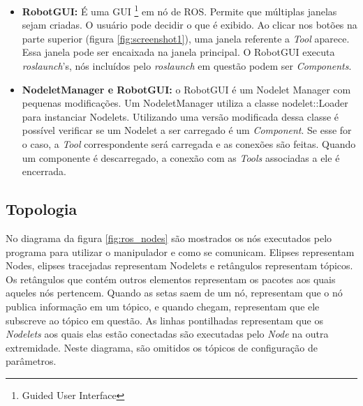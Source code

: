 \begin{itemize}
\item \textbf{RobotGUI:} É uma GUI \footnote{Guided User Interface} em nó de ROS. Permite que múltiplas janelas sejam criadas. O usuário pode decidir o que é exibido. Ao clicar nos botões na parte superior (figura \ref{fig:screenshot1}), uma janela referente a \textit{Tool} aparece. Essa janela pode ser encaixada na janela principal. O RobotGUI executa \textit{roslaunch}'s, nós incluídos pelo \textit{roslaunch} em questão podem ser \textit{Components}. 

\item \textbf{NodeletManager e RobotGUI:} o RobotGUI é um Nodelet Manager com pequenas modificações. Um NodeletManager utiliza a classe nodelet::Loader para instanciar Nodelets. Utilizando uma versão modificada dessa classe é possível verificar se um Nodelet a ser carregado é um \textit{Component}. Se esse for o caso, a \textit{Tool} correspondente será carregada e as conexões são feitas. Quando um componente é descarregado, a conexão com as \textit{Tools} associadas a ele é encerrada.
\end{itemize}



\subsection{Topologia}

No diagrama da figura \ref{fig:ros_nodes} são mostrados os nós executados pelo programa para utilizar o manipulador e como se comunicam. Elipses representam Nodes, elipses tracejadas representam Nodelets e retângulos representam tópicos. Os retângulos que contém outros elementos representam os pacotes aos quais aqueles nós pertencem. Quando as setas saem de um nó, representam que o nó publica informação em um tópico, e quando chegam, representam que ele subscreve ao tópico em questão. As linhas pontilhadas representam que os \textit{Nodelets} aos quais elas estão conectadas são executadas pelo \textit{Node} na outra extremidade. Neste diagrama, são omitidos os tópicos de configuração de parâmetros.

